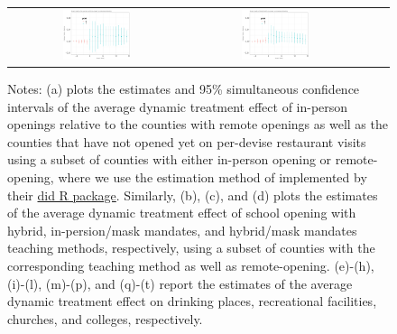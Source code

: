 \documentclass[9pt,twoside,lineno]{pnas-new}
\theoremstyle{definition}
\begin{document}
\begin{figure}[!ht]
{\begin{minipage}{\linewidth}
\begin{tabular}{cccc}
 \includegraphics[width=0.4\textwidth]{tables_and_figures/event_college_csfullno.pdf}& \includegraphics[width=0.4\textwidth]{tables_and_figures/event_college_cshybridno.pdf}  
\end{tabular}
 \end{minipage}}
\vspace{-0.2cm}  {\scriptsize
\begin{flushleft}
Notes: (a) plots the estimates and 95\% simultaneous confidence intervals of  the average dynamic treatment effect of in-person openings relative to the counties with remote openings as well as the counties that have not opened yet on per-devise restaurant visits using a subset of counties with either in-person opening or remote-opening, where we use the estimation method of \cite{Callaway2020} implemented by their \href{https://cran.r-project.org/web/packages/did/vignettes/did-basics.html}{did R package}.  Similarly, (b), (c), and (d) plots the estimates of  the average dynamic treatment effect of school opening with hybrid, in-persion/mask mandates, and hybrid/mask mandates teaching methods, respectively, using a subset of counties with the corresponding teaching method as well as remote-opening. (e)-(h), (i)-(l), (m)-(p), and (q)-(t)  report the estimates of the average dynamic treatment effect on drinking places, recreational facilities, churches, and colleges,  respectively.  

\end{flushleft}}
\end{figure}
\end{document}
